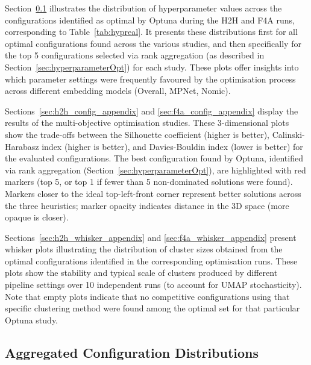 \documentclass[10pt,oneside]{report}
\begin{document}
Section~\ref{sec:agg_config_dist} illustrates the distribution of hyperparameter values across the configurations identified as optimal by Optuna during the H2H and F4A runs, corresponding to Table~\ref{tab:hypreal}. It presents these distributions first for all optimal configurations found across the various studies, and then specifically for the top 5 configurations selected via rank aggregation (as described in Section~\ref{sec:hyperparameterOpt}) for each study. These plots offer insights into which parameter settings were frequently favoured by the optimisation process across different embedding models (Overall, MPNet, Nomic).

Sections~\ref{sec:h2h_config_appendix} and \ref{sec:f4a_config_appendix} display the results of the multi-objective optimisation studies. These 3-dimensional plots show the trade-offs between the Silhouette coefficient (higher is better), Calinski-Harabasz index (higher is better), and Davies-Bouldin index (lower is better) for the evaluated configurations. The best configuration found by Optuna, identified via rank aggregation (Section~\ref{sec:hyperparameterOpt}), are highlighted with red markers (top 5, or top 1 if fewer than 5 non-dominated solutions were found). Markers closer to the ideal top-left-front corner represent better solutions across the three heuristics; marker opacity indicates distance in the 3D space (more opaque is closer).

Sections~\ref{sec:h2h_whisker_appendix} and \ref{sec:f4a_whisker_appendix} present whisker plots illustrating the distribution of cluster sizes obtained from the optimal configurations identified in the corresponding optimisation runs. These plots show the stability and typical scale of clusters produced by different pipeline settings over 10 independent runs (to account for UMAP stochasticity). Note that empty plots indicate that no competitive configurations using that specific clustering method were found among the optimal set for that particular Optuna study.

\subsection{Aggregated Configuration Distributions}\label{sec:agg_config_dist}
\clearpage
\end{document}
